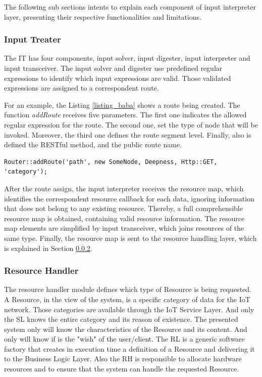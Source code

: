 \documentclass[3p,times]{elsarticle}
\begin{document}
The following sub sections intents to explain each component of input interpreter layer, presenting their respective functionalities and limitations.

\subsubsection{Input Treater}
\label{input_treater}

The IT has four components, input solver, input digester, input interpreter and input transceiver.
The input solver and digester use predefined regular expressions to identify which input expressions are valid. 
Those validated expressions are assigned to a correspondent route.

For an example, the Listing \ref{listing_baba} shows a route being created.
The function \textit{addRoute} receives five parameters. The first one indicates
the allowed regular expression for the route. The second one, set the type of node that will be invoked.
Moreover, the third one defines the route segment level. Finally, also is defined the RESTful method, and 
the public route name.

\begin{minipage}{0.475\textwidth}
	\begin{lstlisting}[frame=single, caption=Route Assign, label=listing_baba]
Router::addRoute('path', new SomeNode, Deepness, Http::GET, 'category');
	\end{lstlisting}
\end{minipage}


After the route assign, the input interpreter receives the resource map, which identifies the correspondent resource callback for each data,
ignoring information that does not belong to any existing resource. Thereby, a full comprehensible resource map is obtained, containing valid resource information.
The resource map elements are simplified by input transceiver, which joins resources of the same type.
Finally, the resource map is sent to the resource handling layer, which is explained in Section \ref{resource_handler}.

\subsubsection{Resource Handler}
\label{resource_handler}

The resource handler module defines which type of Resource is being requested. A Resource, in the view of the system, is a specific category of data for the IoT network. Those categories are available through the IoT Service Layer. And only the SL knows the entire category and its reason of existence. The presented system only will know the characteristics of the Resource and its content. And only will know if is the "wish" of the user/client.
The RL is a generic software factory that creates in execution time a definition of a Resource and delivering it to the Business Logic Layer. Also the RH is responsible to allocate hardware resources and to ensure that the system can handle the requested Resource.
\end{document}

